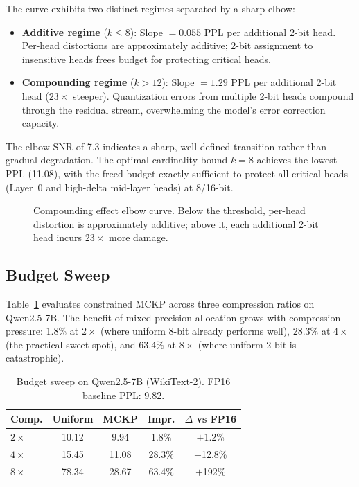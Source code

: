 \documentclass[11pt,a4paper]{article}
\begin{document}
The curve exhibits two distinct regimes separated by a sharp elbow:
\begin{itemize}
\item \textbf{Additive regime} ($k \leq 8$): Slope $= 0.055$ PPL per additional 2-bit head. Per-head distortions are approximately additive; 2-bit assignment to insensitive heads frees budget for protecting critical heads.
\item \textbf{Compounding regime} ($k > 12$): Slope $= 1.29$ PPL per additional 2-bit head ($23\times$ steeper). Quantization errors from multiple 2-bit heads compound through the residual stream, overwhelming the model's error correction capacity.
\end{itemize}

The elbow SNR of 7.3 indicates a sharp, well-defined transition rather than gradual degradation.
The optimal cardinality bound $k = 8$ achieves the lowest PPL (11.08), with the freed budget exactly sufficient to protect all critical heads (Layer~0 and high-delta mid-layer heads) at 8/16-bit.

\begin{figure}[t]
\centering
{}
\caption{Compounding effect elbow curve. Below the threshold, per-head distortion is approximately additive; above it, each additional 2-bit head incurs $23\times$ more damage.}
\label{fig:elbow}
\end{figure}

\subsection{Budget Sweep}

Table~\ref{tab:budget} evaluates constrained MCKP across three compression ratios on Qwen2.5-7B.
The benefit of mixed-precision allocation grows with compression pressure: 1.8\% at $2\times$ (where uniform 8-bit already performs well), 28.3\% at $4\times$ (the practical sweet spot), and 63.4\% at $8\times$ (where uniform 2-bit is catastrophic).

\begin{table}[t]
\centering
\small
\caption{Budget sweep on Qwen2.5-7B (WikiText-2). FP16 baseline PPL: 9.82.}
\label{tab:budget}
\begin{tabular}{lcccc}
\toprule
\textbf{Comp.} & \textbf{Uniform} & \textbf{MCKP} & \textbf{Impr.} & $\Delta$ \textbf{vs FP16} \\
\midrule
$2\times$ & 10.12 & 9.94 & 1.8\% & $+$1.2\% \\
$4\times$ & 15.45 & 11.08 & 28.3\% & $+$12.8\% \\
$8\times$ & 78.34 & 28.67 & 63.4\% & $+$192\% \\
\bottomrule
\end{tabular}
\end{table}
\end{document}
